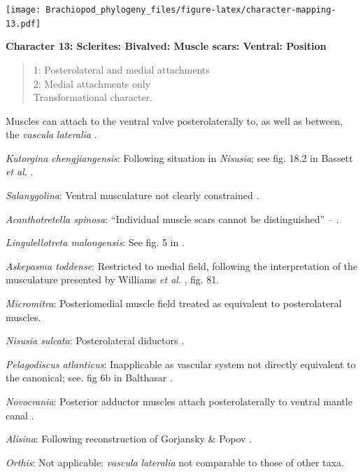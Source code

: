 \documentclass[]{book}
\theoremstyle{definition}
\theoremstyle{definition}
\theoremstyle{definition}
\theoremstyle{remark}
\begin{document}
\texttt{[image: Brachiopod\_phylogeny\_files/figure-latex/character-mapping-13.pdf]}

\textbf{Character 13: Sclerites: Bivalved: Muscle scars: Ventral:
Position}

\begin{quote}
1: Posterolateral and medial attachments\\
2: Medial attachments only\\
Transformational character.
\end{quote}

Muscles can attach to the ventral valve posterolaterally to, as well as
between, the \emph{vascula} \emph{lateralia}
\citep{Popov1992TheCambrian}.

\emph{Kutorgina chengjiangensis}: Following situation in \emph{Nisusia};
see fig. 18.2 in Bassett \emph{et al}.
\citeyearpar{Bassett2001Functionalmorphology}.

\emph{Salanygolina}: Ventral musculature not clearly constrained
\citep{Holmer2009Theenigmatic}.

\emph{Acanthotretella spinosa}: ``Individual muscle scars cannot be
distinguished'' -- \citet{Holmer2006Aspinose}.

\emph{Lingulellotreta malongensis}: See fig. 5 in
\citet{Holmer1997EarlyCambrian}.

\emph{Askepasma toddense}: Restricted to medial field, following the
interpretation of the musculature presented by Williams \emph{et al}.
\citeyearpar{Williams2000BrachiopodaLinguliformea}, fig. 81.

\emph{Micromitra}: Posteriomedial muscle field \citep[text-fig.
6]{Williams1998Thediversity} treated as equivalent to posterolateral
muscles.

\emph{Nisusia sulcata}: Posterolateral diductors \citep[fig. 18.2
in][]{Bassett2001Functionalmorphology}.

\emph{Pelagodiscus atlanticus}: Inapplicable as vascular system not
directly equivalent to the canonical; see. fig 6b in Balthasar
\citeyearpar{Balthasar2009Thebrachiopod}.

\emph{Novocrania}: Posterior adductor muscles attach posterolaterally to
ventral mantle canal \citep{Robinson2014Themuscles}.

\emph{Alisina}: Following reconstruction of Gorjansky \& Popov
\citeyearpar{Gorjansky1986Onthe}.

\emph{Orthis}: Not applicable: \emph{vascula} \emph{lateralia} not
comparable to those of other taxa.
\end{document}

